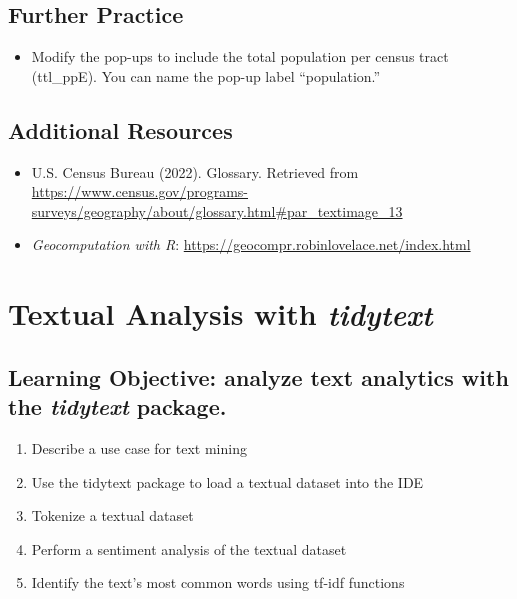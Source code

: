 \documentclass[
  krantz2]{krantz}
\providecommand{\tightlist}{%
  \setlength{\itemsep}{0pt}\setlength{\parskip}{0pt}}
\begin{document}
\hypertarget{tmap-study}{%
\section{Further Practice}\label{tmap-study}}

\begin{itemize}
\tightlist
\item
  Modify the pop-ups to include the total population per census tract (ttl\_ppE). You can name the pop-up label ``population.''
\end{itemize}

\hypertarget{tmap-resources}{%
\section{Additional Resources}\label{tmap-resources}}

\begin{itemize}
\item
  U.S. Census Bureau (2022). Glossary. Retrieved from \url{https://www.census.gov/programs-surveys/geography/about/glossary.html\#par_textimage_13}
\item
  \emph{Geocomputation with R}: \url{https://geocompr.robinlovelace.net/index.html}
\end{itemize}

\hypertarget{tidytext}{%
\chapter{\texorpdfstring{Textual Analysis with \emph{tidytext}}{Textual Analysis with tidytext}}\label{tidytext}}

\hypertarget{tidytext-los}{%
\section{\texorpdfstring{Learning Objective: analyze text analytics with the \emph{tidytext} package.}{Learning Objective: analyze text analytics with the tidytext package.}}\label{tidytext-los}}

\begin{enumerate}
\def\labelenumi{\arabic{enumi}.}
\tightlist
\item
  Describe a use case for text mining
\item
  Use the tidytext package to load a textual dataset into the IDE
\item
  Tokenize a textual dataset
\item
  Perform a sentiment analysis of the textual dataset
\item
  Identify the text's most common words using tf-idf functions
\end{enumerate}
\end{document}

